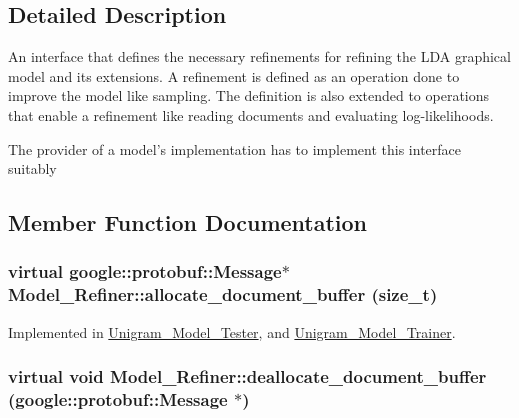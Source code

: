 \subsection{Detailed Description}
An interface that defines the necessary refinements for refining the LDA graphical model and its extensions. A refinement is defined as an operation done to improve the model like sampling. The definition is also extended to operations that enable a refinement like reading documents and evaluating log-\/likelihoods.

The provider of a model's implementation has to implement this interface suitably 

\subsection{Member Function Documentation}
\hypertarget{class_model___refiner_a516dd37d4b76cceeb18e6bdf269b8b04}{
\subsubsection[{allocate\_\-document\_\-buffer}]{\setlength{\rightskip}{0pt plus 5cm}virtual google::protobuf::Message$\ast$ Model\_\-Refiner::allocate\_\-document\_\-buffer (size\_\-t)}}
\label{class_model___refiner_a516dd37d4b76cceeb18e6bdf269b8b04}


Implemented in \hyperlink{class_unigram___model___tester_a81877bb24ead9124407d32109a83acba}{Unigram\_\-Model\_\-Tester}, and \hyperlink{class_unigram___model___trainer_a92e5a9c1dcd4f1fdf4a2b158f6b31c7b}{Unigram\_\-Model\_\-Trainer}.

\hypertarget{class_model___refiner_a3787b875dfd41de8db8b1e46cfe40d16}{
\subsubsection[{deallocate\_\-document\_\-buffer}]{\setlength{\rightskip}{0pt plus 5cm}virtual void Model\_\-Refiner::deallocate\_\-document\_\-buffer (google::protobuf::Message $\ast$)}}
\label{class_model___refiner_a3787b875dfd41de8db8b1e46cfe40d16}


